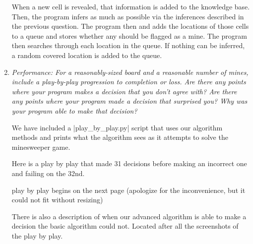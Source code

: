 \documentclass[12pt, twoside]{article}
\begin{document}
\begin{enumerate}[itemsep=2mm,parsep=4mm]
        When a new cell is revealed, that information is added to the knowledge base. Then, the program infers as much as possible via the inferences described in the previous question. The program then and adds the locations of those cells to a queue and stores whether any should be flagged as a mine. The program then searches through each location in the queue. If nothing can be inferred, a random covered location is added to the queue.


        \vfill
        \pagebreak

    \item 
        \textit{Performance: For a reasonably-sized board and a reasonable number of mines, include a play-by-play progression to completion or loss. Are there any points where your program makes a decision that you don’t agree with? Are there any points where your program made a decision that surprised you?  Why was your program able to make that decision?}

        We have included a \cverb|play_by_play.py| script that uses our algorithm methods and prints what the algorithm sees as it attempts to solve the minesweeper game.

        Here is a play by play that made 31 decisions before making an incorrect one and failing on the 32nd.

        play by play begins on the next page (apologize for the inconvenience, but it could not fit without resizing)

        There is also a description of when our advanced algorithm is able to make a decision the basic algorithm could not. Located after all the screenshots of the play by play.


\end{enumerate}
\end{document}
